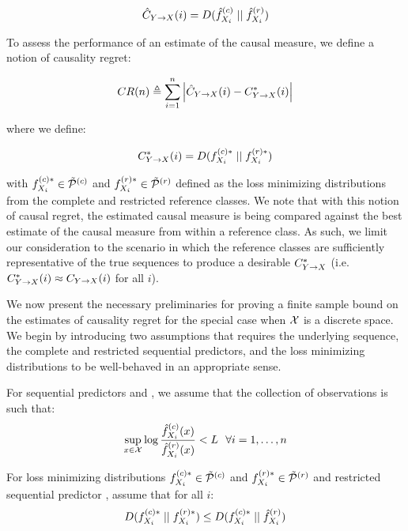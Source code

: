 \begin{equation}
\hat{C}_{Y\rightarrow X}(i) = D(\hat{f}_{X_i}^{(c)} \mid \mid \hat{f}_{X_i}^{(r)})
\end{equation}

To assess the performance of an estimate of the causal measure, we define a notion of causality regret:

\begin{equation}
CR(n) \triangleq \sum_{i=1}^n \left| \hat{C}_{Y\rightarrow X}(i) - C^*_{Y\rightarrow X}(i)  \right|
\end{equation}

\noindent where we define:

\begin{equation}
C^*_{Y\rightarrow X}(i) = D(f_{X_i}^{(c)*} \mid \mid f_{X_i}^{(r)*})
\end{equation}

\noindent with $f_{X_i}^{(c)*} \in \tilde{\mathcal{P}}^{(c)}$ and $f_{X_i}^{(r)*} \in \tilde{\mathcal{P}}^{(r)}$ defined as the loss minimizing distributions from the complete and restricted reference classes. We note that with this notion of causal regret, the estimated causal measure is being compared against the best estimate of the causal measure from within a reference class. As such, we limit our consideration to the scenario in which the reference classes are sufficiently representative of the true sequences to produce a desirable $C^*_{Y\rightarrow X}$ (i.e. $C^*_{Y\rightarrow X}(i) \approx C_{Y\rightarrow X}(i)$ for all $i$).

We now present the necessary preliminaries for proving a finite sample bound on the estimates of causality regret for the special case when $\mathcal{X}$ is a discrete space. We begin by introducing two assumptions that requires the underlying sequence, the complete and restricted sequential predictors, and the loss minimizing distributions to be well-behaved in an appropriate sense.

\begin{assumption} \label{assumption:gbound}
For sequential predictors  and , we assume that the collection of observations is such that:
\begin{equation}
\sup_{x \in \mathcal{X}} \log \frac{\hat{f}_{X_i}^{(c)}(x)}{\hat{f}_{X_i}^{(r)}(x)} < L \ \ \forall i=1,\dots,n
\end{equation}
\end{assumption}

\begin{assumption} \label{assumption:referencekl}
For loss minimizing distributions $f_{X_i}^{(c)*} \in \tilde{\mathcal{P}}^{(c)}$ and $f_{X_i}^{(r)*} \in \tilde{\mathcal{P}}^{(r)}$ and restricted sequential predictor , assume that for all $i$:
\begin{equation}
D(f_{X_i}^{(c)*} \mid \mid f_{X_i}^{(r)*}) \le D(f_{X_i}^{(c)*} \mid \mid \hat{f}_{X_i}^{(r)})
\end{equation}
\end{assumption}

